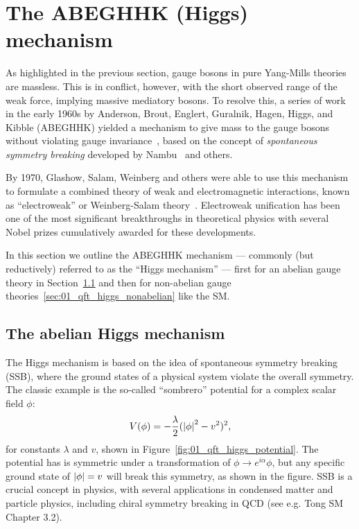 \section{The ABEGHHK (Higgs) mechanism}
\label{sec:01_qft_higgs}

As highlighted in the previous section, gauge bosons in pure Yang-Mills theories are massless.
This is in conflict, however, with the short observed range of the weak force, implying massive mediatory bosons.
To resolve this, a series of work in the early 1960s by Anderson, Brout, Englert, Guralnik, Hagen, Higgs, and Kibble (ABEGHHK) yielded a mechanism to give mass to the gauge bosons without violating gauge invariance~\cite{Anderson:1963pc, Englert:1964et, Higgs:1964pj, Guralnik:1964eu}, based on the concept of \textit{spontaneous symmetry breaking} developed by Nambu~\cite{Nambu:1961tp, Nambu:1961fr} and others.

By 1970, Glashow, Salam, Weinberg and others were able to use this mechanism to formulate a combined theory of weak and electromagnetic interactions, known as ``electroweak'' or Weinberg-Salam theory~\cite{Glashow:1959wxa, Salam:1968rm, Weinberg:1967tq}.
Electroweak unification has been one of the most significant breakthroughs in theoretical physics with several Nobel prizes cumulatively awarded for these developments.

In this section we outline the ABEGHHK mechanism --- commonly (but reductively) referred to as the ``Higgs mechanism'' --- first for an abelian gauge theory in Section~\ref{sec:01_qft_higgs_abelian} and then for non-abelian gauge theories~\ref{sec:01_qft_higgs_nonabelian} like the SM.

\subsection{The abelian Higgs mechanism}
\label{sec:01_qft_higgs_abelian}

The Higgs mechanism is based on the idea of spontaneous symmetry breaking (SSB), where the ground states of a physical system violate the overall symmetry.
The classic example is the so-called ``sombrero'' potential for a complex scalar field $\phi$:
\begin{equation}
	\label{eq:01_qft_higgs_potential}
	V(\phi) = -\frac{\lambda}{2}(\left\lvert \phi \right\rvert^2 - v^2)^2,
\end{equation}
for constants $\lambda$ and $v$, shown in Figure~\ref{fig:01_qft_higgs_potential}.
The potential has is symmetric under a \UU[1] transformation of $\phi \rightarrow e^{i\alpha}\phi$, but any specific ground state of $\left\lvert \phi \right\rvert = v$ will break this symmetry, as shown in the figure.
SSB is a crucial concept in physics, with several applications in condensed matter and particle physics, including chiral symmetry breaking in QCD (see e.g. Tong SM~\cite{TongSM} Chapter 3.2).

